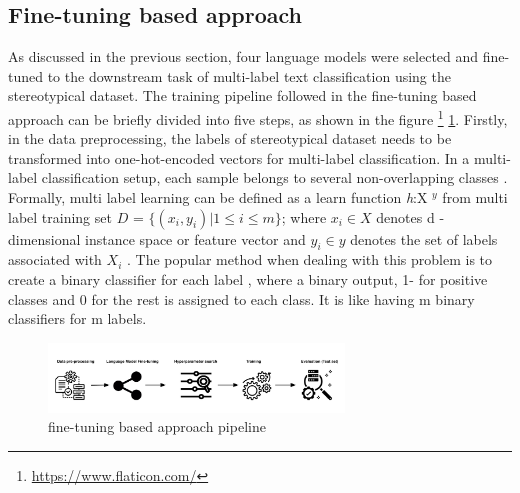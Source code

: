 \subsection{Fine-tuning based approach}
As discussed in the previous section, four language models were selected and fine-tuned to the downstream task of multi-label text classification using the stereotypical dataset. The training pipeline followed in the fine-tuning based approach can be briefly divided into five steps, as shown in the figure \footnote{\url{https://www.flaticon.com/}} \ref{fig:fine-tuning based approach}. Firstly, in the data preprocessing, the labels of stereotypical dataset needs to be transformed into one-hot-encoded vectors for multi-label classification. In a multi-label classification setup, each sample belongs to several non-overlapping classes \cite{sokolova2009systematic}. Formally, multi label learning can be defined as a learn function \textit{h}:X $^y$ from multi label training set $D$ = $\{(x_i,y_i)| 1 \leq i\leq m\}$; where  $x_i \in X$ denotes d - dimensional instance space or feature vector and $y_i \in y$ denotes the  set of labels associated with $X_i$ \cite{zhang2013review}. The popular method when dealing with this problem is to create a binary classifier for each label \cite{ji2008extracting}, where a binary output, 1- for positive classes and 0 for the rest is assigned to each class. 
It is like having m binary classifiers for m labels. 
\pagebreak

\begin{figure}[]
    \centering
    \includegraphics[width=0.7\textwidth]{thesis/figures/LM pipeline.png}
    \caption{fine-tuning based approach pipeline}
    \label{fig:fine-tuning based approach}
\end{figure}

